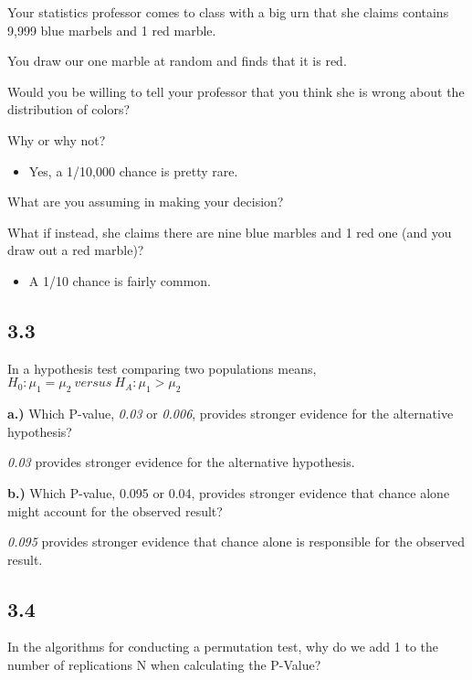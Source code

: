 \documentclass[
  12pt,
]{report}
\providecommand{\tightlist}{%
  \setlength{\itemsep}{0pt}\setlength{\parskip}{0pt}}
\begin{document}
Your statistics professor comes to class with a big urn that she claims
contains 9,999 blue marbels and 1 red marble.

You draw our one marble at random and finds that it is red.

Would you be willing to tell your professor that you think she is wrong
about the distribution of colors?

Why or why not?

\begin{itemize}
\tightlist
\item
  Yes, a 1/10,000 chance is pretty rare.
\end{itemize}

What are you assuming in making your decision?

What if instead, she claims there are nine blue marbles and 1 red one
(and you draw out a red marble)?

\begin{itemize}
\tightlist
\item
  A 1/10 chance is fairly common.
\end{itemize}

\hypertarget{section-2}{%
\subsection{3.3}\label{section-2}}

In a hypothesis test comparing two populations means,
\(H_0 : \mu_1 = \mu_2\ versus \ H_A : \mu_1 > \mu_2\)

\textbf{a.)} Which P-value, \emph{0.03} or \emph{0.006}, provides
stronger evidence for the alternative hypothesis?

\emph{0.03} provides stronger evidence for the alternative hypothesis.

\textbf{b.)} Which P-value, 0.095 or 0.04, provides stronger evidence
that chance alone might account for the observed result?

\emph{0.095} provides stronger evidence that chance alone is responsible
for the observed result.

\hypertarget{section-3}{%
\subsection{3.4}\label{section-3}}

In the algorithms for conducting a permutation test, why do we add 1 to
the number of replications N when calculating the P-Value?
\end{document}
